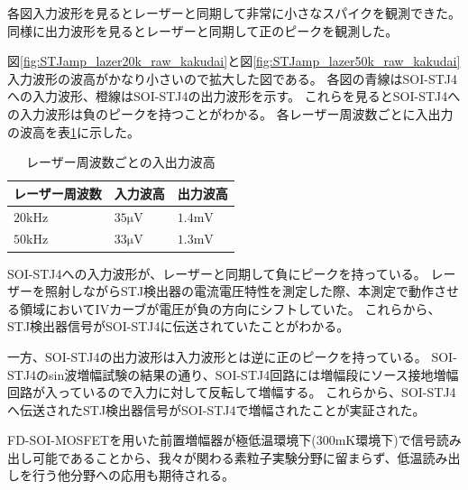 			各図入力波形を見るとレーザーと同期して非常に小さなスパイクを観測できた。
			同様に出力波形を見るとレーザーと同期して正のピークを観測した。
			
			図\ref{fig:STJamp_lazer20k_raw_kakudai}と図\ref{fig:STJamp_lazer50k_raw_kakudai}入力波形の波高がかなり小さいので拡大した図である。
			各図の青線はSOI-STJ4への入力波形、橙線はSOI-STJ4の出力波形を示す。
			これらを見るとSOI-STJ4への入力波形は負のピークを持つことがわかる。
			各レーザー周波数ごとに入出力の波高を表\ref{tab:STJamp_vpp}に示した。
			\begin{table}[htb]
				\begin{center}
					\begin{tabular}{| l || l | l |} \hline
						レーザー周波数 & 入力波高 & 出力波高 \\ \hline \hline
						$20\mathrm{kHz}$ & $35 \mathrm{\mu V}$ & $1.4\mathrm{mV}$ \\ \hline
						$50\mathrm{kHz}$ & $33 \mathrm{\mu V}$ & $1.3\mathrm{mV}$ \\ \hline
					\end{tabular}
					\caption{レーザー周波数ごとの入出力波高}
					\label{tab:STJamp_vpp}
				\end{center}
			\end{table}
			
			SOI-STJ4への入力波形が、レーザーと同期して負にピークを持っている。
			レーザーを照射しながらSTJ検出器の電流電圧特性を測定した際、本測定で動作させる領域においてIVカーブが電圧が負の方向にシフトしていた。
			これらから、STJ検出器信号がSOI-STJ4に伝送されていたことがわかる。
			
			一方、SOI-STJ4の出力波形は入力波形とは逆に正のピークを持っている。
			SOI-STJ4のsin波増幅試験の結果の通り、SOI-STJ4回路には増幅段にソース接地増幅回路が入っているので入力に対して反転して増幅する。
			これらから、SOI-STJ4へ伝送されたSTJ検出器信号がSOI-STJ4で増幅されたことが実証された。
			
			FD-SOI-MOSFETを用いた前置増幅器が極低温環境下(300mK環境下)で信号読み出し可能であることから、我々が関わる素粒子実験分野に留まらず、低温読み出しを行う他分野への応用も期待される。
			
